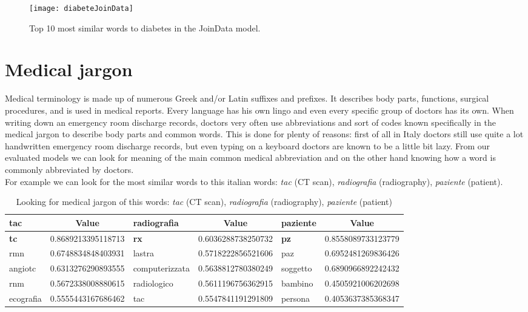 \begin{figure}[ht]
	\centering
	\texttt{[image: diabeteJoinData]}
	\caption[Diabetes - 10 most similar words plotted for JoinData model]{Top 10 most similar words to diabetes in the JoinData model.}
	\label{fig:diabeteJoinData}
\end{figure}
\section{Medical jargon}
Medical terminology is made up of numerous Greek and/or Latin suffixes and prefixes. It describes body parts, functions, surgical procedures, and is used in medical reports. Every language has his own lingo and even every specific group of doctors has its own. When writing down an emergency room discharge records, doctors very often use abbreviations and sort of codes known specifically in the medical jargon to describe body parts and common words. This is done for plenty of reasons: first of all in Italy doctors still use quite a lot handwritten emergency room discharge records, but even typing on a keyboard doctors are known to be a little bit lazy.
From our evaluated models we can look for meaning of the main common medical abbreviation and on the other hand knowing how a word is commonly abbreviated by doctors.\\
For example we can look for the most similar words to this italian words: \textit{tac} (CT scan), \textit{radiografia} (radiography), \textit{paziente} (patient).
\begin{table}[h!]
	\begin{center}
		\caption[Most similar words to: \textit{tac} (CT scan), \textit{radiografia} (radiography), \textit{paziente} (patient)]{Looking for medical jargon of this words: \textit{tac} (CT scan), \textit{radiografia} (radiography), \textit{paziente} (patient)}
		\label{tab:tableAbbreviationItalian}
			\begin{tabular}{l|S|l|S|l|S}
				\toprule
				\textbf{tac} & \textbf{Value} & \textbf{radiografia} & \textbf{Value} & \textbf{paziente} & \textbf{Value} \\
				\midrule
				\textbf{tc} & 0.8689213395118713 & \textbf{rx} & 0.6036288738250732 & \textbf{pz} & 0.8558089733123779 \\
				rmn & 0.6748834848403931 & lastra & 0.5718222856521606 & paz & 0.6952481269836426 \\
				angiotc & 0.6313276290893555 & computerizzata & 0.5638812780380249 & soggetto & 0.6890966892242432 \\
				rnm & 0.5672338008880615 & radiologico & 0.5611196756362915 & bambino & 0.4505921006202698 \\			
				ecografia	& 0.5555443167686462 & tac & 0.5547841191291809 & persona & 0.4053637385368347 \\
				\bottomrule
		\end{tabular}
	\end{center}
\end{table}
